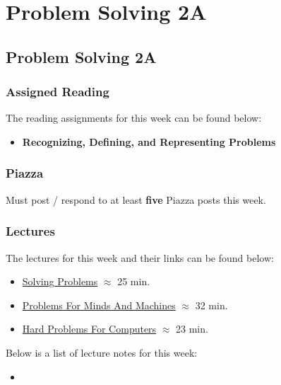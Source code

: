 \clearpage

\renewcommand{\ChapTitle}{Problem Solving 2A}
\renewcommand{\SectionTitle}{Problem Solving 2A}

\chapter{\ChapTitle}
\section{\SectionTitle}

\subsection{Assigned Reading}

The reading assignments for this week can be found below:

\begin{itemize}
    \item \textbf{Recognizing, Defining, and Representing Problems}
\end{itemize}

\subsection{Piazza}

Must post / respond to at least \textbf{five} Piazza posts this week.

\subsection{Lectures}

The lectures for this week and their links can be found below:

\begin{itemize}
    \item \href{https://www.youtube.com/watch?v=YvkDeQP-pQM}{Solving Problems} $\approx$ 25 min.
    \item \href{https://www.youtube.com/watch?v=8h0okzEM13M}{Problems For Minds And Machines} $\approx$ 32 min.
    \item \href{https://www.youtube.com/watch?v=6qwk8NKR0UM}{Hard Problems For Computers} $\approx$ 23 min.
\end{itemize}

\noindent Below is a list of lecture notes for this week:

\begin{itemize}
    \item {}
\end{itemize}

